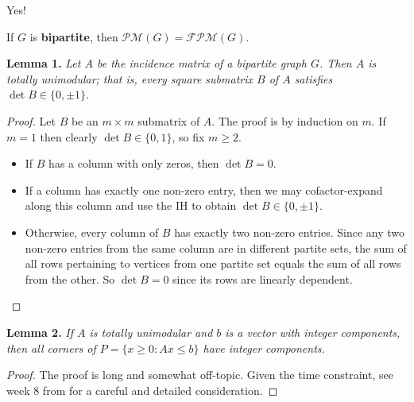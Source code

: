 \begin{frame}
\begin{center}
	\Large Yes!
\end{center}
\end{frame}

\begin{frame}
\begin{center}
	\Large If \( G \) is \textbf{\alert{bipartite}}, then \( \mathcal{PM} (G) = \mathcal{FPM} (G) \).
\end{center}
\end{frame}

\begin{frame}
\textbf{Lemma 1.} \emph{Let \( A \) be the incidence matrix of a bipartite graph \( G \). Then \( A \) is totally unimodular; that is, every square submatrix \( B \) of \( A \) satisfies \( \det B \in \{ 0, \pm 1 \}  \).}\pause
\begin{proof}
Let \( B \) be an \( m \times m \) submatrix of \( A \). The proof is by induction on \( m \). If \( m = 1 \) then clearly \( \det B \in \{ 0,1 \}  \), so fix \( m \geq 2 \).
\begin{itemize}
	\item<3-> If \( B \) has a column with only zeros, then \( \det B = 0 \).
	\item<4-> If a column has exactly one non-zero entry, then we may cofactor-expand along this column and use the IH to obtain \( \det B \in \{ 0, \pm 1 \}  \).
	\item<5-> Otherwise, every column of \( B \) has exactly two non-zero entries. Since any two non-zero entries from the same column are in different partite sets, the sum of all rows pertaining to vertices from one partite set equals the sum of all rows from the other. So \( \det B = 0 \) since its rows are linearly dependent.
\end{itemize}
\end{proof}
\end{frame}

\begin{frame}
	\textbf{Lemma 2.} \emph{If \( A \) is totally unimodular and \( b \) is a vector with integer components, then all corners of \( P = \{ x \geq 0 : Ax \leq b \}  \) have integer components.}\pause
\begin{proof}
	The proof is long and somewhat off-topic. Given the time constraint, see week 8 from {} for a careful and detailed consideration.
\end{proof}
\end{frame}

